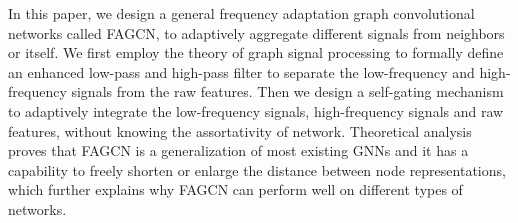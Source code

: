 \documentclass[letterpaper]{article} %
\begin{document}

In this paper, we design a general frequency adaptation graph convolutional networks called FAGCN, to adaptively aggregate different signals from neighbors or itself.
We first employ the theory of graph signal processing to formally define an enhanced low-pass and high-pass filter to separate the low-frequency and high-frequency signals from the raw features.
Then we design a self-gating mechanism to adaptively integrate the low-frequency signals, high-frequency signals and raw features, without knowing the assortativity of network. 
Theoretical analysis proves that FAGCN is a generalization of most existing GNNs and it has a capability to freely shorten or enlarge the distance between node representations, which further explains why FAGCN can perform well on different types of networks.



\end{document}
